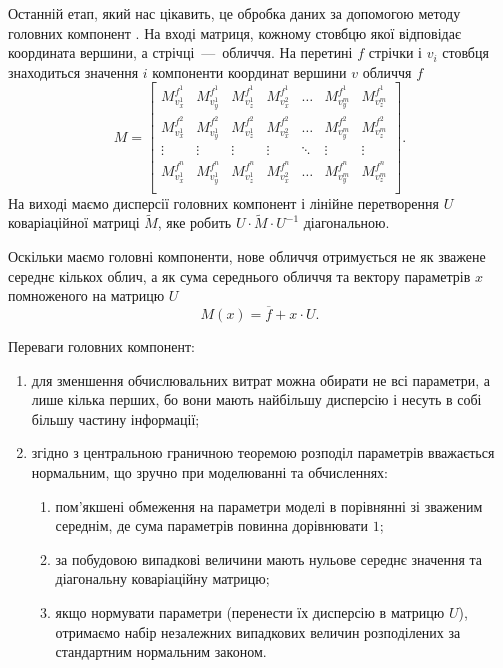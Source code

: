 Останній етап, який нас цікавить,
це обробка даних за допомогою методу головних компонент \cite{Aivazyan:1989}.
На вході матриця, кожному стовбцю якої відповідає координата вершини,
а стрічці~---~обличчя.
На перетині $f$ стрічки і $v_i$ стовбця знаходиться значення $i$ компоненти
координат вершини $v$ обличчя $f$
\begin{equation*}
  M = \begin{bmatrix}
    M_{v_x^1}^{f^1} & M_{v_y^1}^{f^1} & M_{v_z^1}^{f^1} & M_{v_x^2}^{f^1}
      & \dots                         & M_{v_y^m}^{f^1} & M_{v_z^m}^{f^1} \\
    M_{v_x^1}^{f^2} & M_{v_y^1}^{f^2} & M_{v_z^1}^{f^2} & M_{v_x^2}^{f^2}
      & \dots                         & M_{v_y^m}^{f^2} & M_{v_z^m}^{f^2} \\
    \vdots          & \vdots          & \vdots          & \vdots
      & \ddots                        & \vdots          & \vdots \\
    M_{v_x^1}^{f^n} & M_{v_y^1}^{f^n} & M_{v_z^1}^{f^n} & M_{v_x^2}^{f^n}
      & \dots                         & M_{v_y^m}^{f^n} & M_{v_z^m}^{f^n} \\
  \end{bmatrix}.
\end{equation*}
На виході маємо дисперсії головних компонент
і лінійне перетворення $U$ коваріаційної матриці $\widetilde{M}$,
яке робить $U \cdot \widetilde{M} \cdot U^{-1}$ діагональною.

Оскільки маємо головні компоненти,
нове обличчя отримується не як зважене середнє кількох облич,
а як сума середнього обличчя та вектору параметрів $x$
помноженого на матрицю $U$
\begin{equation*}
  M\left( x \right) = \overline{f} + x \cdot U.
\end{equation*}

Переваги головних компонент:
\begin{enumerate}
  \item для зменшення обчислювальних витрат можна обирати не всі параметри,
    а лише кілька перших,
    бо вони мають найбільшу дисперсію
    і несуть в собі більшу частину інформації;
  \item згідно з центральною граничною теоремою
    розподіл параметрів вважається нормальним,
      що зручно при моделюванні та обчисленнях:
  \begin{enumerate}
    \item пом'якшені обмеження на параметри моделі в порівнянні
      зі зваженим середнім, де сума параметрів повинна дорівнювати $1$;
    \item за побудовою випадкові величини мають нульове середнє значення
      та діагональну коваріаційну матрицю;
    \item якщо нормувати параметри (перенести їх дисперсію в матрицю $U$),
      отримаємо набір незалежних випадкових величин
      розподілених за стандартним нормальним законом.
  \end{enumerate}
\end{enumerate}

